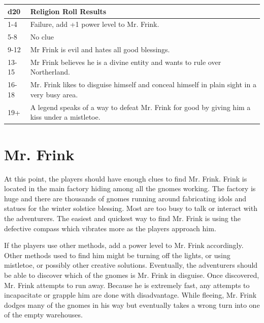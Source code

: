 \documentclass{article}
\begin{document}
\begin{multicols*}{2}
	\begin{table}[H]
		\begin{tabular}{|m{2.5em}|m{20em}|}
			\hline
			\textbf{d20} & \textbf{Religion Roll Results} \\
			\hline
			\hline
			1-4 & Failure, add +1 power level to Mr. Frink. \\
			\hline
			5-8 & No clue  \\
			\hline
			9-12 & Mr Frink is evil and hates all good blessings. \\
			\hline
			13-15 & Mr Frink believes he is a divine entity and wants to rule over Northerland. \\ 
			\hline
			16-18 & Mr. Frink likes to disguise himself and conceal himself in plain sight in a very busy area. \\
			\hline
			19+ & A legend speaks of a way to defeat Mr. Frink for good by giving him a kiss under a mistletoe.\\
			\hline
		\end{tabular}
	\end{table}

	
	
	\section{Mr. Frink}
	
	At this point, the players should have enough clues to find Mr. Frink. Frink is located in the main factory hiding among all the gnomes working. The factory is huge and there are thousands of gnomes running around fabricating idols and statues for the winter solstice blessing. Most are too busy to talk or interact with the adventurers. The easiest and quickest way to find Mr. Frink is using the defective compass which vibrates more as the players approach him. 
	
	If the players use other methods, add a power level to Mr. Frink accordingly. Other methods used to find him might be turning off the lights, or using mistletoe, or possibly other creative solutions. Eventually, the adventurers should be able to discover which of the gnomes is Mr. Frink in disguise. Once discovered, Mr. Frink attempts to run away. Because he is extremely fast, any attempts to incapacitate or grapple him are done with disadvantage. While fleeing, Mr. Frink dodges many of the gnomes in his way but eventually takes a wrong turn into one of the empty warehouses.
	

\end{multicols*}
\end{document}
